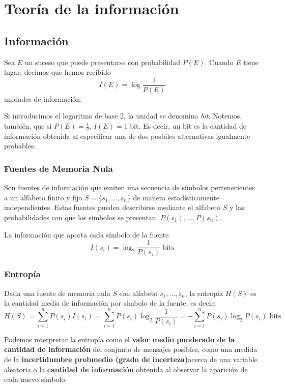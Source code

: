 \section{Teoría de la información}
\subsection{Información}
Sea \(E\) un suceso que puede presentarse con probabilidad \(P(E)\). Cuando \(E\) tiene lugar, decimos que hemos recibido \[I(E)=\log\frac
{1}{P(E)}\] unidades de información.

Si introducimos el logaritmo de base 2, la unidad se denomina \textit{bit}. Notemos, también, que si \(P(E) = \frac{1}{2}\), \(I(E) = 1\) bit. Es decir, un bit es la cantidad de información obtenida al especificar una de dos posbiles alternativas igualmente probables.

\subsubsection{Fuentes de Memoria Nula}
Son fuentes de información que emiten una secuencia de símbolos pertenecientes a un alfabeto finito y fijo \(S=\{s_1,\dots,s_n\}\) de manera estadísticamente independientes. Estas fuentes pueden describirse mediante el alfabeto \(S\) y las probabilidades con que los simbolos se presentan: \(P(s_1), \dots, P(s_n)\).

La información que aporta cada símbolo de la fuente \[I(s_i) = \log_2\frac{1}{P(s_i)}\text{ bits}\]
\subsubsection{Entropía}
Dada una fuente de memoria nula \(S\) con alfabeto \({s_1,\dots,s_n}\), la entropía \(H(S)\) es la cantidad media de información por símbolo de la fuente, es decir:
\[H(S) = \sum_{i=1}^n P(s_i)I(s_i) = \sum_{i=1}^n P(s_i)\log_2\frac{1}{P(s_i)} = -\sum_{i=1}^n P(s_i)\log_2 P(s_i)\text{ bits} \]

Podemos interpretar la entropía como el \textbf{valor medio ponderado de la cantidad de información} del conjunto de mensajes posibles, como una medida de la \textbf{incertidumbre probmedio (grado de incerteza)}acerca de una variable aleatoria o la \textbf{cantidad de información} obtenida al observar la aparición de cada nuevo símbolo.

